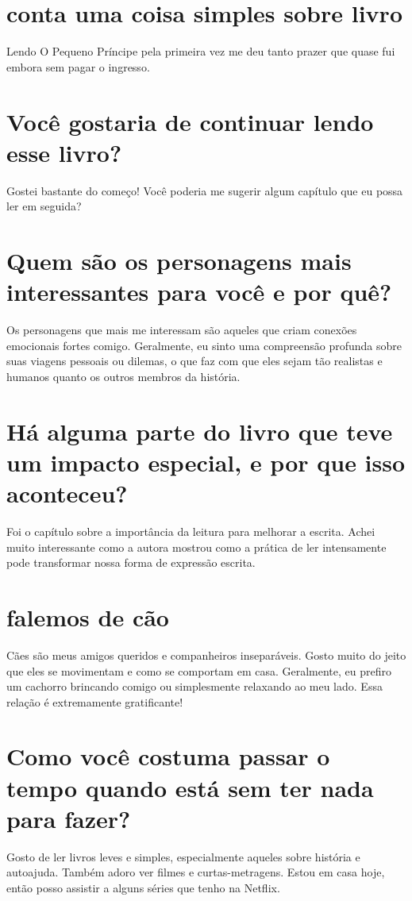 \documentclass[11pt,a4paper]{article}
\begin{document}
\section{conta uma coisa simples sobre livro}
Lendo O Pequeno Príncipe pela primeira vez me deu tanto prazer que quase fui embora sem pagar o ingresso.

\section{Você gostaria de continuar lendo esse livro?}
Gostei bastante do começo! Você poderia me sugerir algum capítulo que eu possa ler em seguida?

\section{Quem são os personagens mais interessantes para você e por quê?}
Os personagens que mais me interessam são aqueles que criam conexões emocionais fortes comigo. Geralmente, eu sinto uma compreensão profunda sobre suas viagens pessoais ou dilemas, o que faz com que eles sejam tão realistas e humanos quanto os outros membros da história.

\section{Há alguma parte do livro que teve um impacto especial, e por que isso aconteceu?}
Foi o capítulo sobre a importância da leitura para melhorar a escrita. Achei muito interessante como a autora mostrou como a prática de ler intensamente pode transformar nossa forma de expressão escrita.

\section{falemos de cão}
Cães são meus amigos queridos e companheiros inseparáveis. Gosto muito do jeito que eles se movimentam e como se comportam em casa. Geralmente, eu prefiro um cachorro brincando comigo ou simplesmente relaxando ao meu lado. Essa relação é extremamente gratificante!

\section{Como você costuma passar o tempo quando está sem ter nada para fazer?}
Gosto de ler livros leves e simples, especialmente aqueles sobre história e autoajuda. Também adoro ver filmes e curtas-metragens. Estou em casa hoje, então posso assistir a alguns séries que tenho na Netflix.
\end{document}
